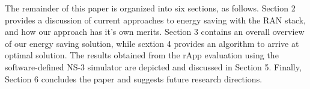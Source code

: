 The remainder of this paper is organized into six sections, as follows.
Section 2 provides a discussion of current approaches to energy saving with the RAN stack, and how our approach has it's own merits. 
Section 3 contains an overall overview of our energy saving solution, while scxtion 4 provides an algorithm to arrive at optimal solution.
The results obtained from the rApp evaluation using the software-defined NS-3 simulator are depicted and discussed in Section 5. 
Finally, Section 6 concludes the paper and suggests future research directions.\\



\begin{comment}
The remainder of this paper is organized into six sections, as follows. 
Section 2 provides some more background on the topic and a discussion of current approaches to energy saving with the RAN stack. 
Section 2 contains an overall overview of the rApp and it's functioning. 
Section 3 presents the architecture and the overall flow of the proposed energy saving algorithm. 
Section 4 presents the underlying rationale utilized by the proposed approach and then details the model selection and training. 
The results obtained from the rApp evaluation in the software-defined O-RAN simulation are depicted and discussed in Section 5. 
Finally, Section 6 concludes the paper and suggests future research directions.\\

With the rise in Internet literacy network providers face the challenge of creating a robust infrastructure that supports a growing number of users while also accommodating increasingly complex and data-intensive applications.
This expansion, along with the advent of next-generation networks, results in larger and more intricate networks. 
As the number of network nodes increases, the energy required to maintain such dense and complex cellular networks also escalates, making their energy consumption a significant concern [\textcolor{blue}{might cite something here}].


\end{comment}
